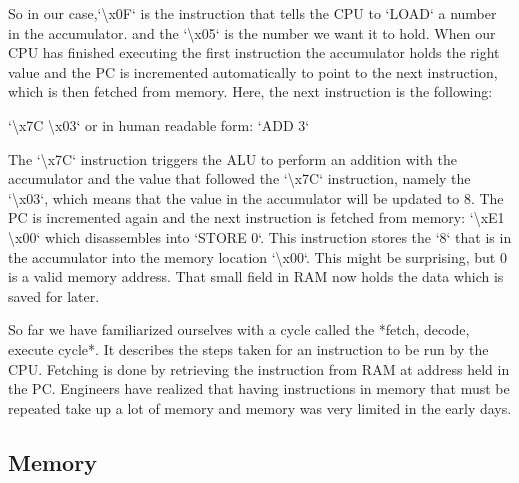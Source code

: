So in our case,`\backslash{}x0F` is the instruction that tells the CPU to `LOAD` a number in the accumulator.
and the `\backslash{}x05` is the number we want it to hold. When our CPU has finished executing the first
instruction the accumulator holds the right value and the PC is incremented automatically to point
to the next instruction, which is then fetched from memory. Here, the next instruction is the
following:

`\backslash{}x7C \backslash{}x03` or in human readable form:  `ADD 3`

The `\backslash{}x7C` instruction triggers the ALU to perform an addition with the accumulator and
the value that followed the `\backslash{}x7C` instruction, namely the `\backslash{}x03`, which means that the value
in the accumulator will be updated to 8. The PC is incremented again and the next instruction is
fetched from memory: `\backslash{}xE1 \backslash{}x00` which disassembles into `STORE 0`. This instruction stores the `8` 
that is in the accumulator into the memory location `\backslash{}x00`. This might be surprising, but 0 is a
valid memory address. That small field in RAM now holds the data which is saved for later.

So far we have familiarized ourselves with a cycle called the *fetch, decode, execute cycle*. It 
describes the steps taken for an instruction to be run by the CPU. Fetching is done by retrieving
the instruction from RAM at address held in the PC. Engineers have realized that having instructions in memory that must be repeated take up a lot of memory
and memory was very limited in the early days.

\subsection{Memory}

